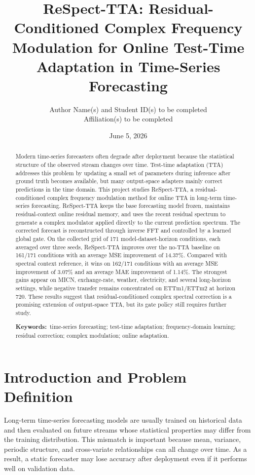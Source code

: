 \documentclass[10pt]{article}
\title{\textbf{ReSpect-TTA: Residual-Conditioned Complex Frequency Modulation for Online Test-Time Adaptation in Time-Series Forecasting}}
\author{
  Author Name(s) and Student ID(s) to be completed\\
  Affiliation(s) to be completed
}
\date{June 5, 2026}
\begin{document}
\maketitle

\begin{abstract}
Modern time-series forecasters often degrade after deployment because the statistical structure of the observed stream changes over time. Test-time adaptation (TTA) addresses this problem by updating a small set of parameters during inference after ground truth becomes available, but many output-space adapters mainly correct predictions in the time domain. This project studies ReSpect-TTA, a residual-conditioned complex frequency modulation method for online TTA in long-term time-series forecasting. ReSpect-TTA keeps the base forecasting model frozen, maintains residual-context online residual memory, and uses the recent residual spectrum to generate a complex modulator applied directly to the current prediction spectrum. The corrected forecast is reconstructed through inverse FFT and controlled by a learned global gate. On the collected grid of 171 model-dataset-horizon conditions, each averaged over three seeds, ReSpect-TTA improves over the no-TTA baseline on 161/171 conditions with an average MSE improvement of 14.37\%. Compared with spectral context reference, it wins on 162/171 conditions with an average MSE improvement of 3.07\% and an average MAE improvement of 1.14\%. The strongest gains appear on MICN, exchange-rate, weather, electricity, and several long-horizon settings, while negative transfer remains concentrated on ETTm1/ETTm2 at horizon 720. These results suggest that residual-conditioned complex spectral correction is a promising extension of output-space TTA, but its gate policy still requires further study.

\textbf{Keywords:}~time-series forecasting; test-time adaptation; frequency-domain learning; residual correction; complex modulation; online adaptation.
\end{abstract}

\section{Introduction and Problem Definition}

Long-term time-series forecasting models are usually trained on historical data and then evaluated on future streams whose statistical properties may differ from the training distribution. This mismatch is important because mean, variance, periodic structure, and cross-variate relationships can all change over time. As a result, a static forecaster may lose accuracy after deployment even if it performs well on validation data.
\end{document}
